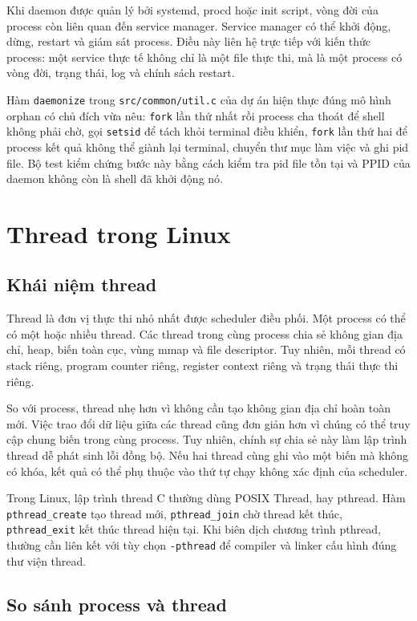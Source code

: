 \documentclass[11pt]{article}
\newcommand{\code}[1]{\texttt{#1}}
\begin{document}
Khi daemon được quản lý bởi systemd, procd hoặc init script, vòng đời của process còn liên quan đến service manager. Service manager có thể khởi động, dừng, restart và giám sát process. Điều này liên hệ trực tiếp với kiến thức process: một service thực tế không chỉ là một file thực thi, mà là một process có vòng đời, trạng thái, log và chính sách restart.

Hàm \code{daemonize} trong \code{src/common/util.c} của dự án hiện thực đúng mô hình orphan có chủ đích vừa nêu: \code{fork} lần thứ nhất rồi process cha thoát để shell không phải chờ, gọi \code{setsid} để tách khỏi terminal điều khiển, \code{fork} lần thứ hai để process kết quả không thể giành lại terminal, chuyển thư mục làm việc và ghi pid file. Bộ test kiểm chứng bước này bằng cách kiểm tra pid file tồn tại và PPID của daemon không còn là shell đã khởi động nó.

\section{Thread trong Linux}

\subsection{Khái niệm thread}

Thread là đơn vị thực thi nhỏ nhất được scheduler điều phối. Một process có thể có một hoặc nhiều thread. Các thread trong cùng process chia sẻ không gian địa chỉ, heap, biến toàn cục, vùng mmap và file descriptor. Tuy nhiên, mỗi thread có stack riêng, program counter riêng, register context riêng và trạng thái thực thi riêng.

So với process, thread nhẹ hơn vì không cần tạo không gian địa chỉ hoàn toàn mới. Việc trao đổi dữ liệu giữa các thread cũng đơn giản hơn vì chúng có thể truy cập chung biến trong cùng process. Tuy nhiên, chính sự chia sẻ này làm lập trình thread dễ phát sinh lỗi đồng bộ. Nếu hai thread cùng ghi vào một biến mà không có khóa, kết quả có thể phụ thuộc vào thứ tự chạy không xác định của scheduler.

Trong Linux, lập trình thread C thường dùng POSIX Thread, hay pthread. Hàm \code{pthread\_create} tạo thread mới, \code{pthread\_join} chờ thread kết thúc, \code{pthread\_exit} kết thúc thread hiện tại. Khi biên dịch chương trình pthread, thường cần liên kết với tùy chọn \code{-pthread} để compiler và linker cấu hình đúng thư viện thread.

\subsection{So sánh process và thread}
\end{document}
